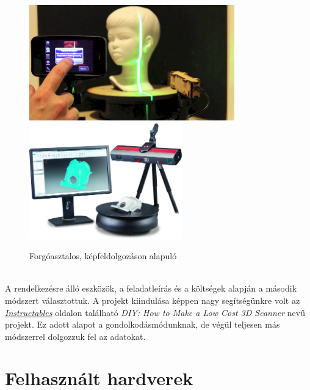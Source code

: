\documentclass[12pt,a4paper]{article}
\begin{document}
	\begin{figure}[h!]
		\begin{center}
			\includegraphics[height=5cm]{images/Mobile_Scan}
			\includegraphics[height=5cm]{images/PC_Scan}
		\end{center}
		\caption{Forgóasztalos, képfeldolgozáson alapuló\cite{MobileScan}\cite{PCScan}}
	\end{figure}\\[10pt]
	A rendelkezésre álló eszközök, a feladatleírás és a költségek alapján a második módszert választottuk. A projekt kiindulása képpen nagy segítségünkre volt az \href{http://www.instructables.com/id/3D-Laser-Scanning-DIY/}{\textit{Instructables}} oldalon található \textit{DIY: How to Make a Low Cost 3D Scanner}\cite{LaserScannerProjekt} nevű projekt. Ez adott alapot a gondolkodásmódunknak, de végül teljesen más módszerrel dolgozzuk fel az adatokat.

\section{Felhasznált hardverek} %
\end{document}
